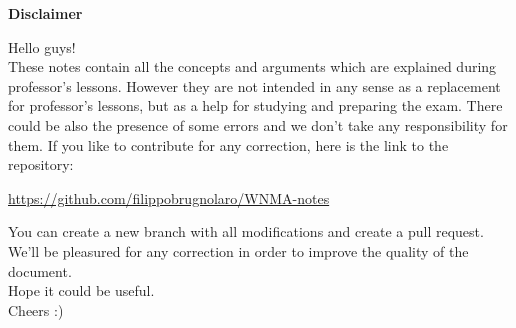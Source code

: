 \vspace*{\fill}
    \begin{center}
        \textbf{\Huge{Disclaimer}}\\
    \end{center}

    \vspace{1cm}

    Hello guys!\\
    These notes contain all the concepts and arguments which are explained
    during professor's lessons.
    However they are not intended in any sense as a replacement for professor's
    lessons, but as a help for studying and preparing the exam.
    There could be also the presence of some errors and we don't take any responsibility
    for them. If you like
    to contribute for any correction, here is the link to the repository:
    \begin{center}
        \url{https://github.com/filippobrugnolaro/WNMA-notes}\\
    \end{center}
    You can create a new branch with all modifications and create a pull request.
    We'll be pleasured for any correction in order to improve the quality of the document.\\
    Hope it could be useful.\\Cheers :)

\vspace*{\fill}
